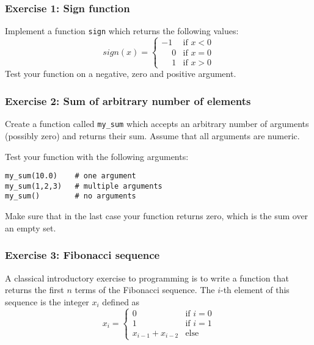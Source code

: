 \documentclass{scrartcl}
\begin{document}
    \hypertarget{exercise-1-sign-function}{%
\subsubsection{Exercise 1: Sign
function}\label{exercise-1-sign-function}}

Implement a function \texttt{sign} which returns the following values:
\[
sign(x) = 
\begin{cases}
-1 & \text{if } x < 0 \\
\phantom{-} 0 & \text{if } x = 0 \\
\phantom{-} 1 & \text{if } x > 0
\end{cases}
\] Test your function on a negative, zero and positive argument.

    \hypertarget{exercise-2-sum-of-arbitrary-number-of-elements}{%
\subsubsection{Exercise 2: Sum of arbitrary number of
elements}\label{exercise-2-sum-of-arbitrary-number-of-elements}}

Create a function called \texttt{my\_sum} which accepts an arbitrary
number of arguments (possibly zero) and returns their sum. Assume that
all arguments are numeric.

Test your function with the following arguments:

\begin{verbatim}
my_sum(10.0)    # one argument
my_sum(1,2,3)   # multiple arguments
my_sum()        # no arguments
\end{verbatim}

Make sure that in the last case your function returns zero, which is the
sum over an empty set.

    \hypertarget{exercise-3-fibonacci-sequence}{%
\subsubsection{Exercise 3: Fibonacci
sequence}\label{exercise-3-fibonacci-sequence}}

A classical introductory exercise to programming is to write a function
that returns the first \(n\) terms of the Fibonacci sequence. The
\(i\)-th element of this sequence is the integer \(x_i\) defined as \[
x_i = 
\begin{cases} 0 & \text{if } i = 0   \\
    1  & \text{if } i = 1\\
    x_{i-1} + x_{i-2} & \text{else}
\end{cases}
\]
\end{document}

